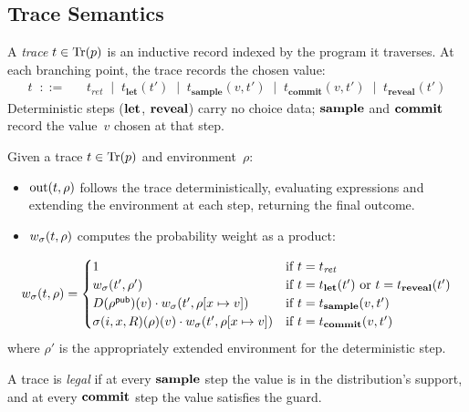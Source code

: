 \documentclass[11pt]{article}
\begin{document}
\subsection{Trace Semantics}\label{sec:tracesem}

\begin{definition}[Trace]\label{def:trace}
A \emph{trace} $t \in \mathrm{Tr}(p)$ is an inductive record indexed by the program it
traverses. At each branching point, the trace records the chosen value:
\begin{align*}
t \;\;::=\;\;
  &\; t_{\mathit{ret}}
  \;\mid\; t_{\mathbf{let}}(t')
  \;\mid\; t_{\mathbf{sample}}(v, t')
  \;\mid\; t_{\mathbf{commit}}(v, t')
  \;\mid\; t_{\mathbf{reveal}}(t')
\end{align*}
Deterministic steps ($\mathbf{let}$, $\mathbf{reveal}$) carry no choice data; $\mathbf{sample}$ and
$\mathbf{commit}$ record the value~$v$ chosen at that step.
\end{definition}

\begin{definition}\label{def:traceweight}
Given a trace $t \in \mathrm{Tr}(p)$ and environment~$\rho$:
\begin{itemize}[nosep]
\item $\mathrm{out}(t, \rho)$ follows the trace deterministically, evaluating
      expressions and extending the environment at each step, returning the
      final outcome.
\item $w_{\sigma}(t, \rho)$ computes the probability weight as a product:
\end{itemize}
\[
w_{\sigma}(t, \rho) =
\begin{cases}
  1 & \text{if } t = t_{\mathit{ret}} \\
  w_{\sigma}(t', \rho') & \text{if } t = t_{\mathbf{let}}(t')
    \text{ or } t = t_{\mathbf{reveal}}(t') \\
  D(\rho^{\mathsf{pub}})(v) \cdot w_{\sigma}(t', \rho[x \mapsto v])
    & \text{if } t = t_{\mathbf{sample}}(v, t') \\
  \sigma(i,x,R)(\rho)(v)
    \cdot w_{\sigma}(t', \rho[x \mapsto v])
    & \text{if } t = t_{\mathbf{commit}}(v, t')
\end{cases}
\]
where $\rho'$ is the appropriately extended environment for the deterministic
step.
\end{definition}

\begin{definition}\label{def:tracelegal}
A trace is \emph{legal} if at every $\mathbf{sample}$ step the value is in the
distribution's support, and at every $\mathbf{commit}$ step the value satisfies the
guard.
\end{definition}
\end{document}

